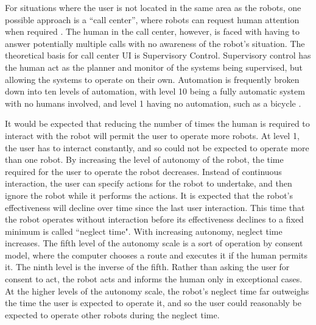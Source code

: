 For situations where the user is not located in the same area as the robots, one possible approach is a ``call center'', where robots can request human attention when required \citep{chen2011supervisory}. 
The human in the call center, however, is faced with having to answer potentially multiple calls with no awareness of the robot's situation. 
The theoretical basis for call center UI is Supervisory Control. 
Supervisory control has the human act as the planner and monitor of the systems being supervised, but allowing the systems to operate on their own.
Automation is frequently broken down into ten levels of automation, with level 10 being a fully automatic system with no humans involved, and level 1 having no automation, such as a bicycle \citep{parasuraman2000model}. 

It would be expected that reducing the number of times the human is required to interact with the robot will permit the user to operate more robots.
At level 1, the user has to interact constantly, and so could not be expected to operate more than one robot. 
By increasing the level of autonomy of the robot, the time required for the user to operate the robot decreases.
Instead of continuous interaction, the user can specify actions for the robot to undertake, and then ignore the robot while it performs the actions.
It is expected that the robot's effectiveness will decline over time since the last user interaction. 
This time that the robot operates without interaction before its effectiveness declines to a fixed minimum is called ``neglect time"\citep{olsen2003metrics}.
With increasing autonomy, neglect time increases.
The fifth level of the autonomy scale is a sort of operation by consent model, where the computer chooses a route and executes it if the human permits it. 
The ninth level is the inverse of the fifth.
Rather than asking the user for consent to act, the robot acts and informs the human only in exceptional cases. 
At the higher levels of the autonomy scale, the robot's neglect time far outweighs the time the user is expected to operate it, and so the user could reasonably be expected to operate other robots during the neglect time. 

